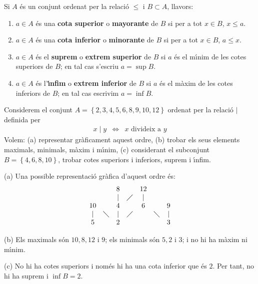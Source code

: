 Si $A$ \'{e}s un conjunt ordenat per la relaci\'{o} $\leq$ i $B\subset A$,
llavors:

\begin{enumerate}
\item $a\in A$ \'{e}s una \textbf{cota superior} o \textbf{mayorante} de $B$
si per a tot $x\in B$, $x\leq a$.

\item $a\in A$ \'{e}s una \textbf{cota inferior} o \textbf{minorante} de $B$
si per a tot $x\in B$, $a\leq x$.

\item $a\in A$ \'{e}s el \textbf{suprem} o \textbf{extrem superior} de $B$
si $a$ \'{e}s el m\'{\i}nim de les cotes superiors de $B$; en tal cas
s'escriu $a=\sup B$.

\item $a\in A$ \'{e}s l'\textbf{\'{\i}nfim} o \textbf{extrem inferior} de $B$
si $a$ \'{e}s el m\`{a}xim de les cotes inferiors de $B$; en tal cas
escrivim $a=\inf B$.
\end{enumerate}

\begin{exemple}
Considerem el conjunt $A=\left\{ 2,3,4,5,6,8,9,10,12\right\} $ ordenat per
la relaci\'{o} $\mid$ definida per%
\begin{equation*}
\begin{array}{ccc}
x\mid y & \Longleftrightarrow & x\text{ divideix a }y%
\end{array}
\end{equation*}
Volem: (a) representar gr\`{a}ficament aquest ordre, (b) trobar els seus
elements maximals, minimals, m\`{a}xim i m\'{\i}nim, (c) considerant el
subconjunt $B=\left\{ 4,6,8,10\right\} $, trobar cotes superiors i
inferiors, suprem i \'{\i}nfim.
\end{exemple}

\begin{solucio}
(a) Una possible representaci\'{o} gr\`{a}fica d'aquest ordre \'{e}s:%
\begin{equation*}
\begin{array}{ccccccc}
&  & 8 &  & 12 &  &  \\
&  & \mid & \diagup & \mid &  &  \\
10 &  & 4 &  & 6 &  & 9 \\
\mid & \diagdown & \mid & \diagup &  & \diagdown & \mid \\
5 &  & 2 &  &  &  & 3%
\end{array}
\end{equation*}

(b) Els maximals s\'{o}n $10,8,12$ i $9$; els minimals s\'{o}n $5,2$ i $3$;
i no hi ha m\`{a}xim ni m\'{\i}nim.

(c) No hi ha cotes superiors i nom\'{e}s hi ha una cota inferior que \'{e}s $%
2$. Per tant, no hi ha suprem i $\inf B=2$.
\end{solucio}

